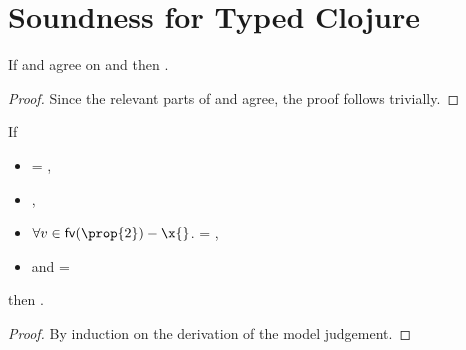 \section{Soundness for Typed Clojure}

{}

\begin{lemma} \label{appendix:lemma:envagree}
  If \openv{} and \openvp{} agree on \fv{\prop{}}
  and \satisfies{\openv{}}{\prop{}}
  then \satisfies{\openvp{}}{\prop{}}.
\begin{proof}
  Since the relevant parts of \openv{} and \openvp{} agree, the proof follows trivially.
\end{proof}
\end{lemma}

\begin{lemma} \label{appendix:lemma:substfilter}
  If 
  \begin{itemize}
    \item {} = { {\object{}} {\x{}}},
    \item
  {},
    \item
  $\forall v \in \fv{\prop{2}} - \x{}$.
                              {} = {},
    \item
  and {} = {}
  \end{itemize}
  then .

  \begin{proof}
    By induction on the derivation of the model judgement.
  \end{proof}
\end{lemma}

